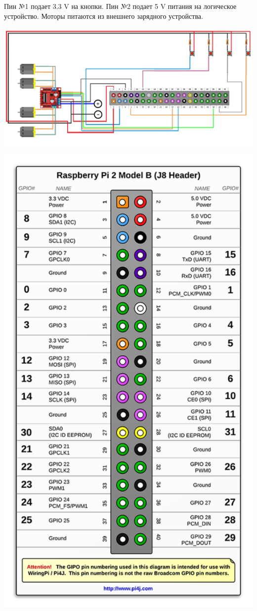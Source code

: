 \documentclass[a4paper,12pt]{article}
\begin{document}
Пин №1 подает 3.3 \unit{\volt} на кнопки. Пин №2 подает 5 \unit{\volt} питания на логическое устройство. Моторы питаются из внешнего зарядного устройства.
\begin{center}
  \includegraphics[width=1.0\textwidth]{energy_first.pdf}
\end{center}
\begin{center}
  \includegraphics[scale=0.5]{pins.pdf}
\end{center}
\end{document}

